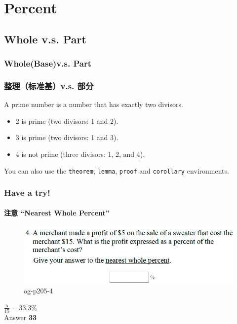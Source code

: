 \documentclass[
	11pt, %
]{beamer}
\begin{document}

\section{Percent}

\subsection{Whole v.s. Part}

\begin{frame}
	\frametitle{Whole(Base)v.s. Part}
	\frametitle{整理（标准基）v.s. 部分}
	\begin{definition}
		A \alert{prime number} is a number that has exactly two divisors.
	\end{definition}
	
	\smallskip %
	
	\begin{example}
		\begin{itemize}
			\item 2 is prime (two divisors: 1 and 2).
			\item 3 is prime (two divisors: 1 and 3).
			\item 4 is not prime (\alert{three} divisors: 1, 2, and 4).
		\end{itemize}
	\end{example}
	
	\smallskip %
	
	You can also use the \texttt{theorem}, \texttt{lemma}, \texttt{proof} and \texttt{corollary} environments.
\end{frame}


\begin{frame}
	\frametitle{Have a try!}
	\framesubtitle{注意 “Nearest Whole Percent”}
	\begin{figure}
		\includegraphics[width=\linewidth]{Percent_Example_Question_2.png}
		\caption{og-p205-4}
	\end{figure}
	\pause
$\frac{5}{15} = 33.\overline{3} \%$ \\

\pause
\bigskip
Answer \textbf{33}
\end{frame}
\end{document}
